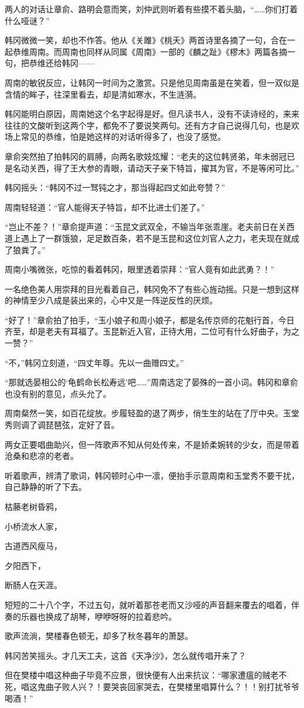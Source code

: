 两人的对话让章俞、路明会意而笑，刘仲武则听着有些摸不着头脑，“……你们打着什么哑谜？”

韩冈微微一笑，却也不作答。他从《关雎》《桃夭》两首诗里各摘了一句，合在一起恭维周南。而周南也同样从同属《周南》一部的《麟之趾》《樛木》两篇各摘一句，把恭维还给韩冈——

周南的敏锐反应，让韩冈一时间为之激赏。只是他见周南虽是在笑着，但一双似是含情的眸子，往深里看去，却是清如寒水，不生涟漪。

韩冈能明白原因，周南她这个名字起得是好。但凡读书人，没有不读诗经的，来来往往的文酸听到这两个字，都免不了要说笑两句。还有方才自己说得几句，也是欢场上常见的恭维，怕是她这样的对话听得多了，也没了感觉。

章俞突然拍了拍韩冈的肩膊，向两名歌妓炫耀：“老夫的这位韩贤弟，年未弱冠已是名动关西，得了王大参的青眼，请动天子亲下特旨，擢其为官，不是等闲可比。”

韩冈摇头：“韩冈不过一驽钝之才，那当得起四丈如此夸赞？”

周南轻轻道：“官人能得天子特旨，却不比进士们差了。”

“岂止不差？！”章俞提声道：“玉昆文武双全，不输当年张乖崖。老夫前日在关西道上遇上了一群饿狼，足足数百条，若不是玉昆和这位刘官人之力，老夫现在就成了狼粪了。”

周南小嘴微张，吃惊的看着韩冈，眼里透着崇拜：“官人竟有如此武勇？！”

一名绝色美人用崇拜的目光看着自己，韩冈免不了有些心旌动摇。只是一想到这样的神情至少八成是装出来的，心中又是一阵逆反性的厌烦。

“好了！”章俞拍了拍手，“玉小娘子和周小娘子，都是名传京师的花魁行首，今日齐至，却是老夫有耳福了。玉昆新近入官，正待大用，二位可有什么好曲子，为之一赞？”

“不，”韩冈立刻道，“四丈年尊。先以一曲赠四丈。”

“那就选晏相公的‘龟鹤命长松寿远’吧……”周南选定了晏殊的一首小词。韩冈和章俞也没有别的意见，点头允了。

周南粲然一笑，如百花绽放。步履轻盈的退了两步，俏生生的站在了厅中央。玉堂秀则调了调琵琶弦，定好了音。

两女正要唱曲助兴，但一阵歌声不知从何处传来，不是娇柔婉转的少女，而是带着沧桑和悲凉的老者。

听着歌声，辨清了歌词，韩冈顿时心中一凛，便抬手示意周南和玉堂秀不要干扰，自己静静的听了下去。

枯藤老树昏鸦，

小桥流水人家，

古道西风瘦马，

夕阳西下，

断肠人在天涯。

短短的二十八个字，不过五句，就听着那苍老而又沙哑的声音翻来覆去的唱着，伴奏的乐器也换成了胡琴，咿咿呀呀的拉着悲吟。

歌声流淌，樊楼春色顿无，却多了秋冬暮年的萧瑟。

韩冈苦笑摇头。才几天工夫，这首《天净沙》，怎么就传唱开来了？

但在樊楼中唱这种曲子毕竟不应景，很快便有人出来抗议：“哪家遭瘟的贼老不死，唱这鬼曲子败人兴？！要哭丧回家哭去，在樊楼里唱算什么？！！别打扰爷爷喝酒！”

